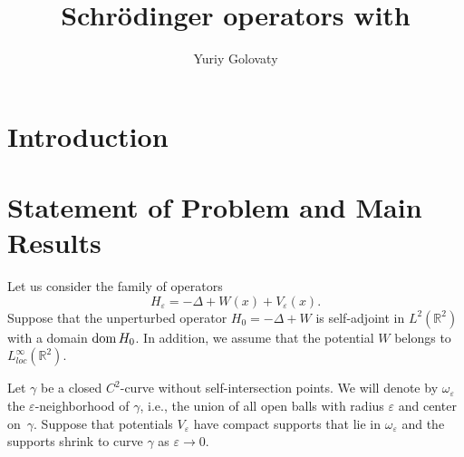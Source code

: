 \documentclass[graybox]{svmult}
\newcommand{\dom}{\mathop{\rm dom}}
\newcommand{\Real}{\mathbb R}
\newcommand{\eps}{\varepsilon}
\begin{document}
\title*{Schr\"{o}dinger operators with}
\author{Yuriy Golovaty}

\maketitle






\section{Introduction  }
\label{Sec:Introduction}




\section{Statement of Problem and Main Results}
\label{Sec:Statment}

Let us consider the family of operators
\begin{equation}\label{OprHe}
H_\eps=-\Delta +W(x)+V_\eps(x).
\end{equation}
Suppose that the unperturbed operator $H_0=-\Delta +W$ is self-adjoint in $L^2(\Real^2)$ with a domain $\dom H_0$. In addition, we assume that the potential $W$ belongs to $L^\infty_{loc}(\Real^2)$.

Let $\gamma$ be a  closed $C^2$-curve without self-intersection
points. We will denote by $\omega_\eps$ the $\eps$-neighborhood of $\gamma$, i.e., the union of all open balls with radius $\eps$ and center on~$\gamma$.  Suppose that potentials $V_\eps$ have compact supports that lie in $\omega_\eps$ and  the supports  shrink to curve $\gamma$ as $\eps\to 0$.
\end{document}
